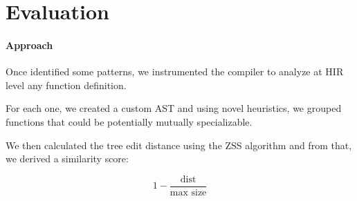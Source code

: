 \section{Evaluation}\label{sec:evaluation}


\begin{frame}{\secname}
	\framesubtitle{Approach}

	Once identified some patterns, %
	we \alert{instrumented} the compiler to analyze at \alert{HIR} level %
	any function definition.

	\bigskip

	For each one, we created a custom \alert{AST} %
	and using novel heuristics, we grouped functions that could be potentially mutually specializable. %

	\bigskip

	We then calculated the \alert{tree edit distance} %
	using the ZSS algorithm %
	and from that, we derived a similarity score:

	$$1 - \frac{\text{dist}}{\text{max size}}$$


\end{frame}


